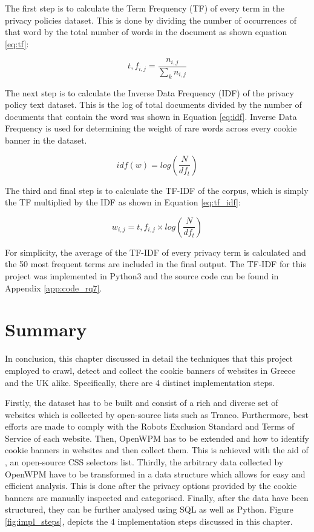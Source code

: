 \documentclass[../main.tex]{subfiles}
\begin{document}
The first step is to calculate the Term Frequency (TF) of every term in the privacy policies dataset. This is done by dividing the number of occurrences of that word by the total number of words in the document as shown equation \ref{eq:tf}:

\begin{equation}
    t,f_{i,j} = \frac{n_{i,j}}{\sum_{k}^{} n_{i,j}}
    \label{eq:tf}
\end{equation}

The next step is to calculate the Inverse Data Frequency (IDF) of the privacy policy text dataset. This is the log of total documents divided by the number of documents that contain the word was shown in Equation \ref{eq:idf}. Inverse Data Frequency is used for determining the weight of rare words across every cookie banner in the dataset.

\begin{equation}
    idf(w) = log(\frac{N}{df_t})
    \label{eq:idf}
\end{equation}

The third and final step is to calculate the TF-IDF of the corpus, which is simply the TF multiplied by the IDF as shown in Equation \ref{eq:tf_idf}:

\begin{equation}
    w_{i,j} = t,f_{i,j} \times log(\frac{N}{df_t})
    \label{eq:tf_idf}
\end{equation}

For simplicity, the average of the TF-IDF of every privacy term is calculated and the 50 most frequent terms are included in the final output. The TF-IDF for this project was implemented in Python3 and the source code can be found in Appendix \ref{app:code_rq7}.

\section{Summary}
In conclusion, this chapter discussed in detail the techniques that this project employed to crawl, detect and collect the cookie banners of websites in Greece and the UK alike. Specifically, there are 4 distinct implementation steps.

Firstly, the dataset has to be built and consist of a rich and diverse set of websites which is collected by open-source lists such as Tranco. Furthermore, best efforts are made to comply with the Robots Exclusion Standard and Terms of Service of each website. Then, OpenWPM has to be extended and  how to identify cookie banners in websites and then collect them. This is achieved with the aid of , an open-source CSS selectors list. Thirdly, the arbitrary data collected by OpenWPM have to be transformed in a data structure which allows for easy and efficient analysis. This is done after the privacy options provided by the cookie banners are manually inspected and categorised.  Finally, after the data have been structured, they can be further analysed using SQL as well as Python. Figure \ref{fig:impl_steps}, depicts the 4 implementation steps discussed in this chapter.
\end{document}
